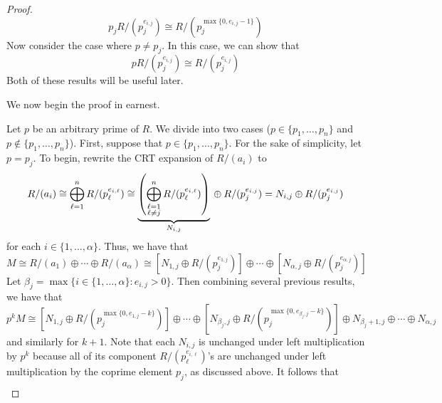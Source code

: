 \documentclass[../psets.tex]{subfiles}
\begin{document}
\begin{enumerate}
\begin{enumerate}
\begin{proof}
            \begin{equation*}
                p_jR/(p_j^{e_{i,j}}) \cong R/(p_j^{\max\{0,e_{i,j}-1\}})
            \end{equation*}
            Now consider the case where $p\neq p_j$. In this case, we can show that
            \begin{equation*}
                pR/(p_j^{e_{i,j}}) \cong R/(p_j^{e_{i,j}})
            \end{equation*}
            Both of these results will be useful later.\par\medskip
            We now begin the proof in earnest.\par\smallskip
            Let $p$ be an arbitrary prime of $R$. We divide into two cases ($p\in\{p_1,\dots,p_n\}$ and $p\notin\{p_1,\dots,p_n\}$). First, suppose that $p\in\{p_1,\dots,p_n\}$. For the sake of simplicity, let $p=p_j$. To begin, rewrite the CRT expansion of $R/(a_i)$ to
            \begin{equation*}
                R/(a_i) \cong \bigoplus_{\ell=1}^nR/(p_\ell^{e_{i,\ell}})
                \cong \underbrace{\left( \bigoplus_{\substack{\ell=1\\\ell\neq j}}^nR/(p_\ell^{e_{i,\ell}}) \right)}_{N_{i,j}}\vphantom{h}\oplus R/(p_j^{e_{i,j}})
                = N_{i,j}\oplus R/(p_j^{e_{i,j}})
            \end{equation*}
            for each $i\in\{1,\dots,\alpha\}$. Thus, we have that
            \begin{equation*}
                M \cong R/(a_1)\oplus\cdots\oplus R/(a_\alpha)
                \cong [N_{1,j}\oplus R/(p_j^{e_{1,j}})]\oplus\cdots\oplus[N_{\alpha,j}\oplus R/(p_j^{e_{\alpha,j}})]
            \end{equation*}
            Let $\beta_j=\max\{i\in\{1,\dots,\alpha\}:e_{i,j}>0\}$. Then combining several previous results, we have that
            \begin{equation*}
                p^kM \cong [N_{1,j}\oplus R/(p_j^{\max\{0,e_{1,j}-k\}})]\oplus\cdots\oplus[N_{\beta_j,j}\oplus R/(p_j^{\max\{0,e_{\beta_j,j}-k\}})]\oplus N_{\beta_j+1,j}\oplus\cdots\oplus N_{\alpha,j}
            \end{equation*}
            and similarly for $k+1$. Note that each $N_{i,j}$ is unchanged under left multiplication by $p^k$ because all of its component $R/(p_\ell^{e_{i,\ell}})$'s are unchanged under left multiplication by the coprime element $p_j$, as discussed above. It follows that
            \begin{multline*}

\end{multline*}
\end{proof}
\end{enumerate}
\end{enumerate}
\end{document}
